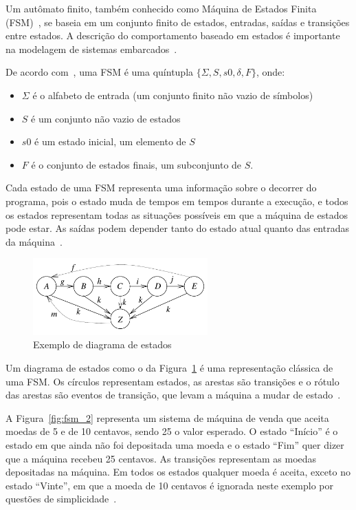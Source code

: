 Um autômato finito, também conhecido como Máquina de Estados Finita (FSM)~\cite{wagner:2006}, se baseia em um conjunto finito de estados, entradas, saídas e transições entre estados. A descrição do comportamento baseado em estados é importante na modelagem de sistemas embarcados~\cite{marwedel:2010}.

De acordo com~, uma FSM é uma quíntupla \(\{\Sigma, S, s0, \delta, F\}\), onde:
\begin{itemize}
    \item \(\Sigma\) é o alfabeto de entrada (um conjunto finito não vazio de símbolos)
    \item \(S\) é um conjunto não vazio de estados
    \item \(s0\) é um estado inicial, um elemento de \(S\)
    \item \(F\) é o conjunto de estados finais, um subconjunto de \(S\).
\end{itemize}

Cada estado de uma FSM representa uma informação sobre o decorrer do programa, pois o estado muda de tempos em tempos durante a execução, e todos os estados representam todas as situações possíveis em que a máquina de estados pode estar. As saídas podem depender tanto do estado atual quanto das entradas da máquina~\cite{wagner:2006}.

\begin{figure}[ht]
	\caption{\label{fig:fsm}Exemplo de diagrama de estados}
	\begin{center}
	    \includegraphics[width=0.6\textwidth]{resources/fsm_marwedel}
	\end{center}
\end{figure}

Um diagrama de estados como o da Figura~\ref{fig:fsm} é uma representação clássica de uma FSM\@. Os círculos representam estados, as arestas são transições e o rótulo das arestas são eventos de transição, que levam a máquina a mudar de estado~\cite{marwedel:2010}.

A Figura~\ref{fig:fsm_2} representa um sistema de máquina de venda que aceita moedas de 5 e de 10 centavos, sendo 25 o valor esperado. O estado ``Início'' é o estado em que ainda não foi depositada uma moeda e o estado ``Fim'' quer dizer que a máquina recebeu 25 centavos. As transições representam as moedas depositadas na máquina. Em todos os estados qualquer moeda é aceita, exceto no estado ``Vinte'', em que a moeda de 10 centavos é ignorada neste exemplo por questões de simplicidade~\cite{wagner:2006}.

